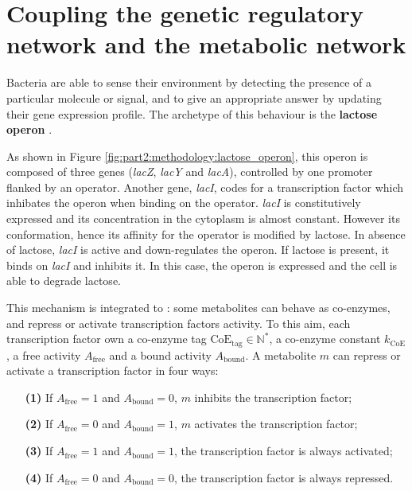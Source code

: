 
\section{Coupling the genetic regulatory network and the metabolic network}
\label{sec:part2:methodology:coupling_networks}

Bacteria are able to sense their environment by detecting the presence of a particular molecule or signal, and to give an appropriate answer by updating their gene expression profile. The archetype of this behaviour is the \textbf{lactose operon} \citep{jacob-and-monod-1961}.

As shown in Figure \ref{fig:part2:methodology:lactose_operon}, this operon is composed of three genes (\textit{lacZ}, \textit{lacY} and \textit{lacA}), controlled by one promoter flanked by an operator. Another gene, \textit{lacI}, codes for a transcription factor which inhibates the operon when binding on the operator. \textit{lacI} is constitutively expressed and its concentration in the cytoplasm is almost constant. However its conformation, hence its affinity for the operator is modified by lactose. In absence of lactose, \textit{lacI} is active and down-regulates the operon. If lactose is present, it binds on \textit{lacI} and inhibits it. In this case, the operon is expressed and the cell is able to degrade lactose.

This mechanism is integrated to {\EvoEvoSim}: some metabolites can behave as co-enzymes, and repress or activate transcription factors activity. To this aim, each transcription factor own a co-enzyme tag $\text{CoE}_\text{tag} \in \mathbb{N}^*$, a co-enzyme constant $k_\text{CoE}$, a free activity $A_{\text{free}}$ and a bound activity $A_{\text{bound}}$. A metabolite $m$ can repress or activate a transcription factor in four ways:
\begin{enumerate}
\item[\textbf{(1)}] If $A_{\text{free}} = 1$ and $A_{\text{bound}} = 0$, $m$ inhibits the transcription factor;
\item[\textbf{(2)}] If $A_{\text{free}} = 0$ and $A_{\text{bound}} = 1$, $m$ activates the transcription factor;
\item[\textbf{(3)}] If $A_{\text{free}} = 1$ and $A_{\text{bound}} = 1$, the transcription factor is always activated;
\item[\textbf{(4)}] If $A_{\text{free}} = 0$ and $A_{\text{bound}} = 0$, the transcription factor is always repressed.
\end{enumerate}

